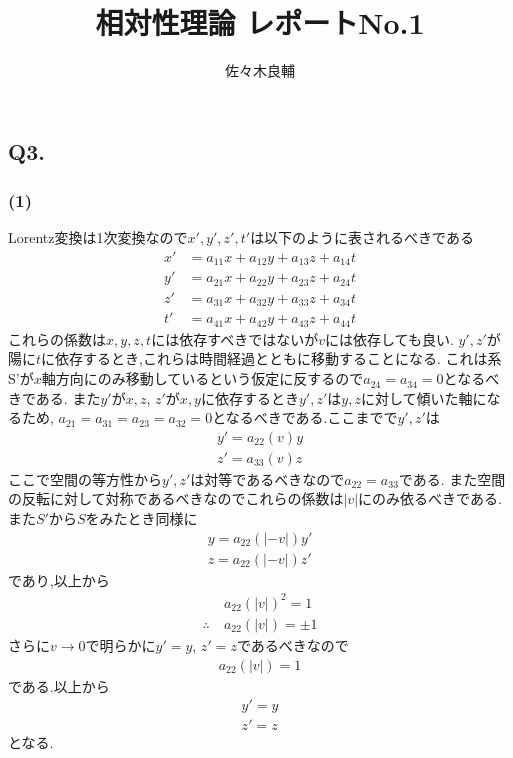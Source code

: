 \documentclass[uplatex,a4j,11pt,dvipdfmx]{jsarticle}
\begin{document}
\title{相対性理論 レポートNo.1}
\author{佐々木良輔}
\date{}
\maketitle
\subsection*{Q3.}
\subsubsection*{(1)}
Lorentz変換は1次変換なので$x',y',z',t'$は以下のように表されるべきである
\begin{align*}
  x'&=a_{11}x+a_{12}y+a_{13}z+a_{14}t\\
  y'&=a_{21}x+a_{22}y+a_{23}z+a_{24}t\\
  z'&=a_{31}x+a_{32}y+a_{33}z+a_{34}t\\
  t'&=a_{41}x+a_{42}y+a_{43}z+a_{44}t
\end{align*}
これらの係数は$x,y,z,t$には依存すべきではないが$v$には依存しても良い.
$y',z'$が陽に$t$に依存するとき,これらは時間経過とともに移動することになる.
これは系S'が$x$軸方向にのみ移動しているという仮定に反するので$a_{24}=a_{34}=0$となるべきである.
また$y'$が$x,z$, $z'$が$x,y$に依存するとき$y',z'$は$y,z$に対して傾いた軸になるため,
$a_{21}=a_{31}=a_{23}=a_{32}=0$となるべきである.ここまでで$y',z'$は
\begin{align*}
  y'=a_{22}(v)y\\
  z'=a_{33}(v)z
\end{align*}
ここで空間の等方性から$y',z'$は対等であるべきなので$a_{22}=a_{33}$である.
また空間の反転に対して対称であるべきなのでこれらの係数は$|v|$にのみ依るべきである.
また$S'$から$S$をみたとき同様に
\begin{align*}
  y=a_{22}(|-v|)y'\\
  z=a_{22}(|-v|)z'
\end{align*}
であり,以上から
\begin{align*}
  &a_{22}(|v|)^2=1\\
  \therefore\ &a_{22}(|v|)=\pm1
\end{align*}
さらに$v\rightarrow 0$で明らかに$y'=y$, $z'=z$であるべきなので
\begin{align*}
  a_{22}(|v|)=1
\end{align*}
である.以上から
\begin{align}
  y'=y\\
  z'=z
\end{align}
となる.
\end{document}
